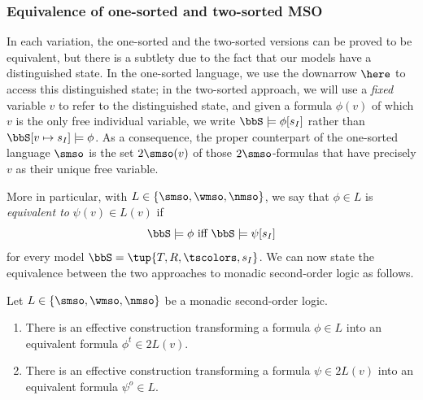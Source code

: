 \subsubsection*{Equivalence of one-sorted and two-sorted MSO}
In each variation, the one-sorted and the two-sorted versions can be proved to
be equivalent, but there is a subtlety due to the fact that our models have a 
distinguished state.
In the one-sorted language, we use the downarrow $\here$ to access this
distinguished state; in the two-sorted approach, we will use a \emph{fixed}
variable $v$ to refer to the distinguished state, and given a formula 
$\phi(v)$ of which $v$ is the only free individual variable, we write 
$\bbS \models \phi[s_{I}]$ rather than $\bbS[v \mapsto s_{I}] \models \phi$.
As a consequence, the proper counterpart of the one-sorted language $\smso$ is
the set $2\smso(v)$ of those $2\smso$-formulas that have precisely $v$ 
as their unique free variable.

More in particular, with $L \in \{\smso, \wmso, \nmso\}$, we say that $\phi \in
L$ is \emph{equivalent to} $\psi(v) \in L(v)$ if
\[
\bbS \models \phi \text{ iff } \bbS \models \psi[s_{I}]
\]
for every model $\bbS = \tup{T,R,\tscolors, s_I}$.
We can now state the equivalence between the two approaches to 
monadic second-order logic as follows.

\begin{proposition}
\label{p:msovs2mso}
Let $L \in \{\smso, \wmso, \nmso\}$ be a monadic second-order logic.
\begin{enumerate}
\item
There is an effective construction transforming a formula $\phi \in L$ into
an equivalent formula $\phi^{t} \in 2L(v)$.
\item
There is an effective construction transforming a formula $\psi \in 2L(v)$ into
an equivalent formula $\psi^{o} \in L$.
\end{enumerate}
\end{proposition}


